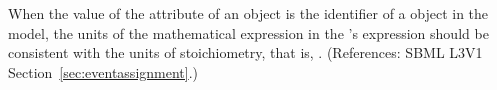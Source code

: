 When the value of the attribute  of an \EventAssignment
object is the identifier of a \SpeciesReference object in the model, the
units of the mathematical expression in the \EventAssignment's 
expression should be consistent with the units of stoichiometry, that is,
.  (References: SBML L3V1
Section~\ref{sec:eventassignment}.)
